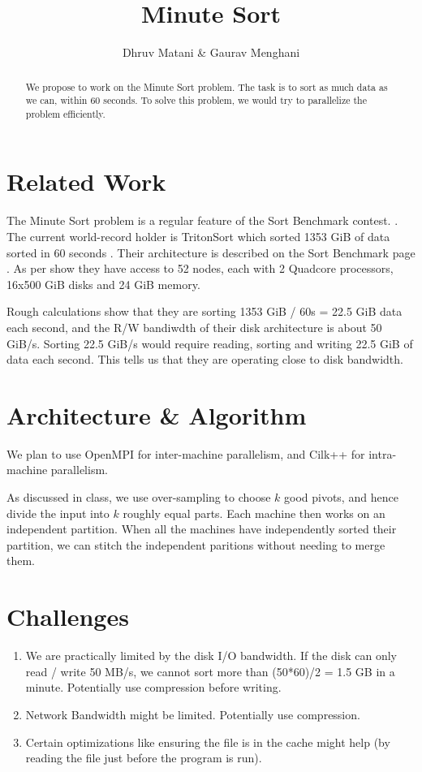 \documentclass{article}
\title{Minute Sort}
\author{Dhruv Matani \& Gaurav Menghani}
\begin{document}
\maketitle

\begin{abstract}
We propose to work on the Minute Sort problem. The task is to sort as much
data as we can, within 60 seconds. To solve this problem, we would try to
parallelize the problem efficiently.
\end{abstract}

\clearpage

\section*{Related Work}
The Minute Sort problem is a regular feature of the Sort Benchmark contest.
\cite{sort-benchmark}. The current world-record holder is TritonSort which sorted 1353 
GiB of data sorted in 60 seconds \cite{triton-sort}. Their architecture is described
on the Sort Benchmark page \cite{sort-benchmark}. As per \cite{sort-benchmark} show they 
have access to 52 nodes, each with 2 Quadcore processors, 16x500 GiB disks and 
24 GiB memory. 

Rough calculations show that they are sorting 1353 GiB / 60s = 
22.5 GiB data each second, and the R/W bandiwdth of their disk architecture
is about 50 GiB/s. Sorting 22.5 GiB/s would require reading, sorting and
writing 22.5 GiB of data each second. This tells us that they are operating
close to disk bandwidth.
\section*{Architecture \& Algorithm}
We plan to use OpenMPI for inter-machine parallelism, and Cilk++ for intra-machine parallelism.

As discussed in class, we use over-sampling to choose $k$ good pivots, and hence divide the input into $k$ roughly equal parts. Each machine then works on an independent partition. When all the machines have independently sorted their partition, we can stitch the independent paritions without needing to merge them.

\section*{Challenges}
\begin{enumerate}
\item We are practically limited by the disk I/O bandwidth. If the disk can only read / write 50 MB/s, we cannot sort more than (50*60)/2 = 1.5 GB in a minute. Potentially use compression before writing.
\item Network Bandwidth might be limited. Potentially use compression.
\item Certain optimizations like ensuring the file is in the cache might help (by reading the file just before the program is run).
\end{enumerate}
\end{document}
